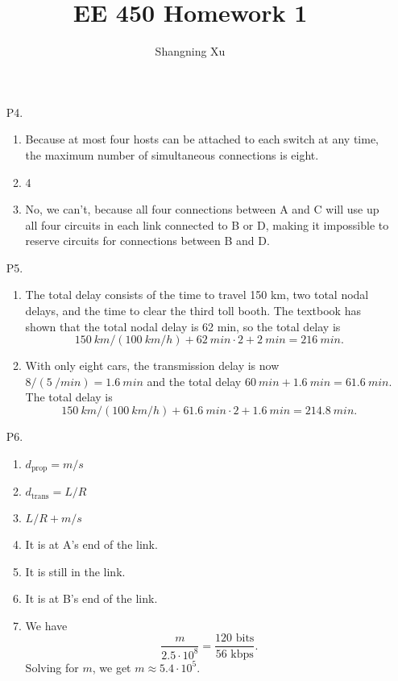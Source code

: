 \documentclass{article}
\title{EE 450 Homework 1}
\author{Shangning Xu}
\begin{document}
\maketitle

\begin{enumerate}
    \item[P4.] \begin{enumerate}
        \item Because at most four hosts can be attached to each switch at any time, the maximum number of simultaneous connections is eight.
        \item 4
        \item No, we can't, because all four connections between A and C will use up all four circuits in each link connected to B or D, making it impossible to reserve circuits for connections between B and D.
    \end{enumerate}

    \item[P5.] \begin{enumerate}
        \item The total delay consists of the time to travel 150 km, two total nodal delays, and the time to clear the third toll booth. The textbook has shown that the total nodal delay is 62 min, so the total delay is
        \[
            \SI{150}{km} / (\SI{100}{km/h}) + \SI{62}{min} \cdot 2 + \SI{2}{min} = \SI{216}{min}.
        \]
        \item With only eight cars, the transmission delay is now $8 / (\SI{5}{/min}) = \SI{1.6}{min}$ and the total delay $\SI{60}{min} + \SI{1.6}{min} = \SI{61.6}{min}$. The total delay is
        \[
            \SI{150}{km} / (\SI{100}{km/h}) + \SI{61.6}{min} \cdot 2 + \SI{1.6}{min} = \SI{214.8}{min}.
        \]
    \end{enumerate}

    \item[P6.] \begin{enumerate}
        \item $d_\textrm{prop} = m/s$
        \item $d_\textrm{trans} = L/R$
        \item $L/R + m/s$
        \item It is at A's end of the link.
        \item It is still in the link.
        \item It is at B's end of the link.
        \item We have
        \[
            \frac{m}{2.5 \cdot 10^8} = \frac{120\textrm{ bits}}{56\textrm{ kbps}}.
        \]
        Solving for $m$, we get $m \approx 5.4 \cdot 10^5$.
    \end{enumerate}


\end{enumerate}
\end{document}
